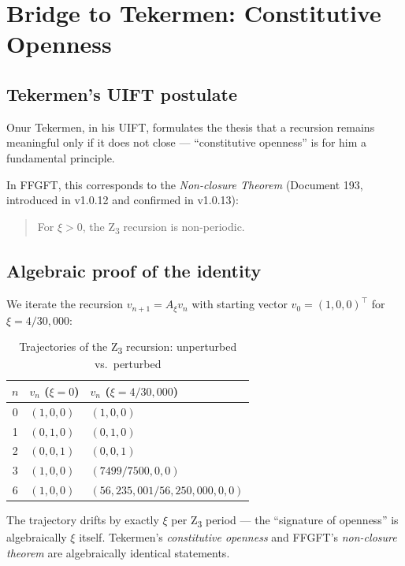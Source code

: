 \section{Bridge to Tekermen: Constitutive Openness}
\label{sec:tekermen}

\subsection{Tekermen's UIFT postulate}

Onur Tekermen, in his UIFT, formulates the thesis that a recursion remains meaningful only if it does not close --- ``constitutive openness'' is for him a fundamental principle.

In FFGFT, this corresponds to the \emph{Non-closure Theorem} (Document 193, introduced in v1.0.12 and confirmed in v1.0.13):
\begin{quote}
For \(\xi > 0\), the Z\textsubscript{3} recursion is non-periodic.
\end{quote}

\subsection{Algebraic proof of the identity}

We iterate the recursion \(v_{n+1} = A_\xi v_n\) with starting vector \(v_0 = (1, 0, 0)^\top\) for \(\xi = 4/30{,}000\):

\begin{table}[h]
\centering
\caption{Trajectories of the Z\textsubscript{3} recursion: unperturbed vs.~perturbed}
\begin{tabular}{cll}
\toprule
\(n\) & \(v_n\) (\(\xi = 0\)) & \(v_n\) (\(\xi = 4/30{,}000\)) \\
\midrule
0 & \((1, 0, 0)\) & \((1, 0, 0)\) \\
1 & \((0, 1, 0)\) & \((0, 1, 0)\) \\
2 & \((0, 0, 1)\) & \((0, 0, 1)\) \\
3 & \((1, 0, 0)\) & \((7499/7500, 0, 0)\) \\
6 & \((1, 0, 0)\) & \((56{,}235{,}001/56{,}250{,}000, 0, 0)\) \\
\bottomrule
\end{tabular}
\end{table}

\begin{keyresult}
The trajectory drifts by exactly \(\xi\) per Z\textsubscript{3} period --- the ``signature of openness'' is algebraically \(\xi\) itself. Tekermen's \emph{constitutive openness} and FFGFT's \emph{non-closure theorem} are algebraically identical statements.
\end{keyresult}

